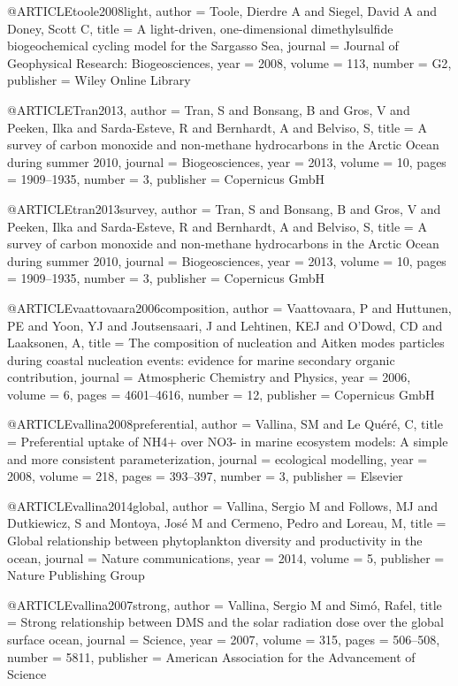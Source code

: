 @ARTICLE{toole2008light,
  author = {Toole, Dierdre A and Siegel, David A and Doney, Scott C},
  title = {A light-driven, one-dimensional dimethylsulfide biogeochemical cycling
	model for the Sargasso Sea},
  journal = {Journal of Geophysical Research: Biogeosciences},
  year = {2008},
  volume = {113},
  number = {G2},
  publisher = {Wiley Online Library}
}

@ARTICLE{Tran2013,
  author = {Tran, S and Bonsang, B and Gros, V and Peeken, Ilka and Sarda-Esteve,
	R and Bernhardt, A and Belviso, S},
  title = {A survey of carbon monoxide and non-methane hydrocarbons in the Arctic
	Ocean during summer 2010},
  journal = {Biogeosciences},
  year = {2013},
  volume = {10},
  pages = {1909--1935},
  number = {3},
  publisher = {Copernicus GmbH}
}

@ARTICLE{tran2013survey,
  author = {Tran, S and Bonsang, B and Gros, V and Peeken, Ilka and Sarda-Esteve,
	R and Bernhardt, A and Belviso, S},
  title = {A survey of carbon monoxide and non-methane hydrocarbons in the Arctic
	Ocean during summer 2010},
  journal = {Biogeosciences},
  year = {2013},
  volume = {10},
  pages = {1909--1935},
  number = {3},
  publisher = {Copernicus GmbH}
}

@ARTICLE{vaattovaara2006composition,
  author = {Vaattovaara, P and Huttunen, PE and Yoon, YJ and Joutsensaari, J
	and Lehtinen, KEJ and O'Dowd, CD and Laaksonen, A},
  title = {The composition of nucleation and Aitken modes particles during coastal
	nucleation events: evidence for marine secondary organic contribution},
  journal = {Atmospheric Chemistry and Physics},
  year = {2006},
  volume = {6},
  pages = {4601--4616},
  number = {12},
  publisher = {Copernicus GmbH}
}

@ARTICLE{vallina2008preferential,
  author = {Vallina, SM and Le Qu{\'e}r{\'e}, C},
  title = {Preferential uptake of NH4+ over NO3- in marine ecosystem models:
	A simple and more consistent parameterization},
  journal = {ecological modelling},
  year = {2008},
  volume = {218},
  pages = {393--397},
  number = {3},
  publisher = {Elsevier}
}

@ARTICLE{vallina2014global,
  author = {Vallina, Sergio M and Follows, MJ and Dutkiewicz, S and Montoya,
	Jos{\'e} M and Cermeno, Pedro and Loreau, M},
  title = {Global relationship between phytoplankton diversity and productivity
	in the ocean},
  journal = {Nature communications},
  year = {2014},
  volume = {5},
  publisher = {Nature Publishing Group}
}

@ARTICLE{vallina2007strong,
  author = {Vallina, Sergio M and Sim{\'o}, Rafel},
  title = {Strong relationship between DMS and the solar radiation dose over
	the global surface ocean},
  journal = {Science},
  year = {2007},
  volume = {315},
  pages = {506--508},
  number = {5811},
  publisher = {American Association for the Advancement of Science}
}

